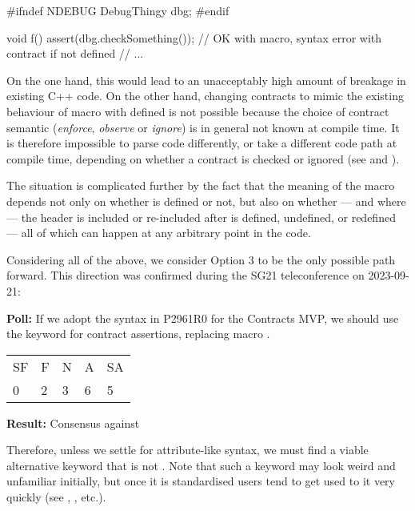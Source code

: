\begin{codeblock}
#ifndef NDEBUG
  DebugThingy dbg;
#endif

void f() {
  assert(dbg.checkSomething());  // OK with macro, syntax error with contract if  not defined
  // ...
}
\end{codeblock}

On the one hand, this would lead to an unacceptably high amount of breakage in existing C++ code. On the other hand, changing contracts to mimic the existing behaviour of macro  with  defined is not possible because the choice of contract semantic (\emph{enforce}, \emph{observe} or \emph{ignore}) is in general not known at compile time. It is therefore impossible to parse code differently, or take a different code path at compile time, depending on whether a contract is checked or ignored (see \cite{P2877R0} and \cite{P2834R1}).

The situation is complicated further by the fact that the meaning of the  macro depends not only on whether  is defined or not, but also on whether --- and where --- the  header is included or re-included after  is defined, undefined, or redefined --- all of which can happen at any arbitrary point in the code.

Considering all of the above, we consider Option 3 to be the only possible path forward. This direction was confirmed during the SG21 teleconference on 2023-09-21:

\begin{adjustwidth}{0.5cm}{0.5cm}
\textbf{Poll:} If we adopt the syntax in P2961R0 for the Contracts MVP, we should use the keyword  for contract assertions, replacing macro .

\begin{tabular}{lllll}
SF & F & N & A & SA \\
0 & 2 & 3 & 6 & 5
\end{tabular}

\textbf{Result:} Consensus against
\end{adjustwidth}

Therefore, unless we settle for attribute-like syntax, we must find a viable alternative keyword that is not . Note that such a keyword may look weird and unfamiliar initially, but once it is standardised users tend to get used to it very quickly (see , , etc.).

